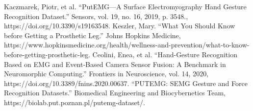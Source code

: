 \documentclass[conference]{IEEEtran}
\begin{document}
\begin{thebibliography}{00}
 Kaczmarek, Piotr, et al. “PutEMG—A Surface Electromyography Hand Gesture Recognition Dataset.” Sensors, vol. 19, no. 16, 2019, p. 3548., https://doi.org/10.3390/s19163548.
 Keszler, Mary. “What You Should Know before Getting a Prosthetic Leg.” Johns Hopkins Medicine, https://www.hopkinsmedicine.org/health/wellness-and-prevention/what-to-know-before-getting-prosthetic-leg. 
 Ceolini, Enea, et al. “Hand-Gesture Recognition Based on EMG and Event-Based Camera Sensor Fusion: A Benchmark in Neuromorphic Computing.” Frontiers in Neuroscience, vol. 14, 2020, https://doi.org/10.3389/fnins.2020.00637. 
 “PUTEMG: SEMG Gesture and Force Recognition Datasets.” Biomedical Engineering and Biocybernetics Team, https://biolab.put.poznan.pl/putemg-dataset/. 
\end{thebibliography}
\end{document}
